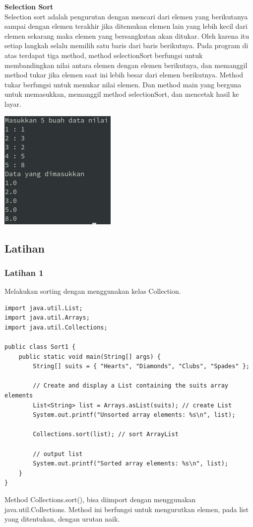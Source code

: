 \documentclass[a4paper,12pt]{article}
\begin{document}
\textbf{Selection Sort\\}
Selection sort adalah pengurutan dengan mencari dari elemen yang berikutanya sampai dengan elemen
terakhir jika ditemukan elemen lain yang lebih kecil dari elemen sekarang maka elemen
yang bersangkutan akan ditukar. Oleh karena itu setiap langkah selalu memilih satu
baris dari baris berikutnya. Pada program di atas terdapat tiga method, method
selectionSort berfungsi untuk membandingkan nilai antara elemen dengan elemen berikutnya, dan memanggil method tukar jika
elemen saat ini lebih besar dari elemen berikutnya. Method tukar berfungsi untuk
menukar nilai elemen. Dan method main yang berguna untuk memasukkan, memanggil method selectionSort, dan mencetak hasil ke
layar.
\begin{center}
    \includegraphics[scale=1]{2.png} 
\end{center}

\newpage

\subsection{Latihan}
\subsubsection{Latihan 1}
Melakukan sorting dengan menggunakan kelas Collection.
\begin{lstlisting}
import java.util.List;
import java.util.Arrays;
import java.util.Collections;

public class Sort1 {
    public static void main(String[] args) {
        String[] suits = { "Hearts", "Diamonds", "Clubs", "Spades" };

        // Create and display a List containing the suits array elements
        List<String> list = Arrays.asList(suits); // create List
        System.out.printf("Unsorted array elements: %s\n", list);

        Collections.sort(list); // sort ArrayList

        // output list
        System.out.printf("Sorted array elements: %s\n", list);
    }
}
\end{lstlisting}
Method Collections.sort(), bisa diimport dengan menggunakan java.util.Collections. Method ini berfungsi untuk
mengurutkan elemen, pada list yang ditentukan, dengan urutan naik.
\end{document}
